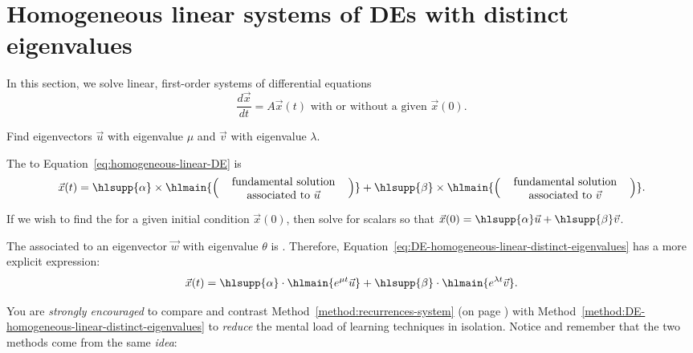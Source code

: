 \documentclass[../main.tex]{subfiles}
\begin{document}
 \section{Homogeneous linear systems of DEs with distinct eigenvalues}
  
In this section, we solve linear, first-order systems of differential equations 
\begin{equation} \label{eq:homogeneous-linear-DE}
  \frac{d\vec{x}}{dt} = A \vec{x}(t) \text{ with or without a given } \vec{x}(0).
\end{equation}

\begin{method} \label{method:DE-homogeneous-linear-distinct-eigenvalues}
  Find eigenvectors \(\vec{u}\) with eigenvalue \(\mu\) and \(\vec{v}\) with eigenvalue \(\lambda\).

  The  to Equation~\eqref{eq:homogeneous-linear-DE} is
  \begin{equation} \label{eq:DE-homogeneous-linear-distinct-eigenvalues}
    \vec{x}(t) = \hlsupp{\alpha} \times \hlmain{\left( \parbox[c]{1.6in}{\centering fundamental solution associated to \(\vec{u}\)} \right) } + \hlsupp{\beta} \times \hlmain{\left( \parbox[c]{1.6in}{\centering fundamental solution associated to \(\vec{v}\)} \right)}.
  \end{equation}

  If we wish to find the  for a given initial condition \(\vec{x}(0)\), then solve for scalars \hlsupp{\(\alpha, \beta\)} so that \(\vec{x}(0) = \hlsupp{\alpha} \vec{u} + \hlsupp{\beta} \vec{v}\). 

  The  associated to an eigenvector \(\vec{w}\) with eigenvalue \(\theta\) is .  Therefore, Equation~\ref{eq:DE-homogeneous-linear-distinct-eigenvalues} has a more explicit expression:
  \[
    \vec{x}(t) = \hlsupp{\alpha} \cdot \hlmain{e^{\mu t} \vec{u}} + \hlsupp{\beta} \cdot \hlmain{e^{\lambda t} \vec{v}}.
  \]
\end{method}

You are \emph{strongly encouraged} to compare and contrast Method~\ref{method:recurrences-system} (on page \pageref{eq:solutions-for-recurrence-systems}) with Method~\ref{method:DE-homogeneous-linear-distinct-eigenvalues} to \emph{reduce} the mental load of learning techniques in isolation. Notice and remember that the two methods come from the same \emph{idea}:  
\end{document}
